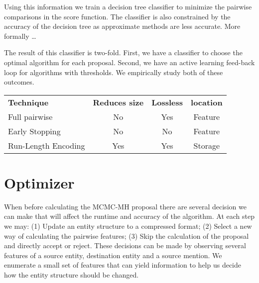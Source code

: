 Using this information we train a decision tree classifier to minimize the 
pairwise comparisons in the score function.
The classifier is also constrained by the accuracy of the decision tree as 
approximate methods are less accurate.
More formally \ldots

The result of this classifier is two-fold.
First, we have a classifier to choose the optimal algorithm for each proposal.
Second, we have an active learning feed-back loop for algorithms with 
thresholds.
We empirically study both of these outcomes.

\begin{tabular}{l c c c}
\textbf{Technique} & \textbf{Reduces size} & \textbf{Lossless} & \textbf{location} \\
Full pairwise & No & Yes & Feature\\
Early Stopping~\cite{singh2012monte} & No & No & Feature\\
Run-Length Encoding & Yes & Yes & Storage\\
\end{tabular}



\section{Optimizer}

When before calculating the MCMC-MH proposal there are several decision we can make
that will affect the runtime and accuracy of the algorithm.
At each step we may:
  (1) Update an entity structure to a compressed format;
  (2) Select a new way of calculating the pairwise features;
  (3) Skip the calculation of the proposal and directly accept or reject.
These decisions can be made by observing several features of a source entity,
destination entity and a source mention.
We enumerate a small set of features that can yield information to
help us decide how the entity structure should be changed.

